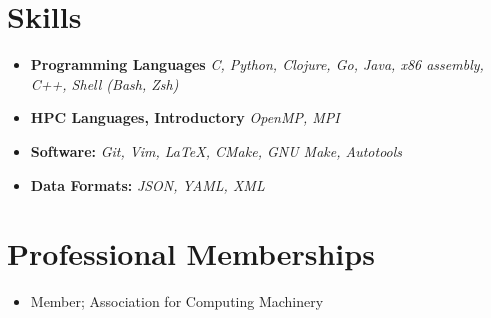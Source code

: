 \documentclass[10pt,letterpaper,sans]{moderncv}
\begin{document}
\section{Skills}

\vspace{3pt}

\begin{itemize}

    \item{
        \textbf{Programming Languages}
        \textit{
            C, Python, Clojure, Go, Java,  x86 assembly, C++, Shell (Bash, Zsh)
        }
    }
    \vspace{3pt}
    \item{
        \textbf{HPC Languages, Introductory}
        \textit{
            OpenMP, MPI
        }
    }
    \item{
        \textbf{Software:}
        \textit{
            Git, Vim, \LaTeX, CMake, GNU Make, Autotools
        }
    }
    \item {
        \textbf{Data Formats:}
        \textit{
            JSON, YAML, XML
        }
    }
\end{itemize}

\section{Professional Memberships}
\begin{itemize}
    \item {
            Member; Association for Computing Machinery
    }
\end{itemize}
\end{document}

